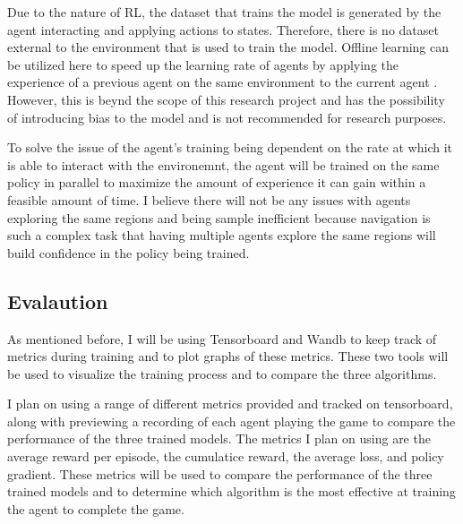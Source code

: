 Due to the nature of RL, the dataset that trains the model is generated by the agent interacting and applying actions to states. Therefore, there is no dataset external to the environment that is used to train the model. Offline learning can be utilized here to speed up the learning rate of agents by applying the experience of a previous agent on the same environment to the current agent \cite{Sutton1}. However, this is beynd the scope of this research project and has the possibility of introducing bias to the model and is not recommended for research purposes.

To solve the issue of the agent's training being dependent on the rate at which it is able to interact with the environemnt, the agent will be trained on the same policy in parallel to maximize the amount of experience it can gain within a feasible amount of time. I believe there will not be any issues with agents exploring the same regions and being sample inefficient because navigation is such a complex task that having multiple agents explore the same regions will build confidence in the policy being trained.

\subsection{Evalaution}

As mentioned before, I will be using Tensorboard and Wandb to keep track of metrics during training and to plot graphs of these metrics. These two tools will be used to visualize the training process and to compare the three algorithms.

I plan on using a range of different metrics provided and tracked on tensorboard, along with previewing a recording of each agent playing the game to compare the performance of the three trained models. The metrics I plan on using are the average reward per episode, the cumulatice reward, the average loss, and policy gradient. These metrics will be used to compare the performance of the three trained models and to determine which algorithm is the most effective at training the agent to complete the game.